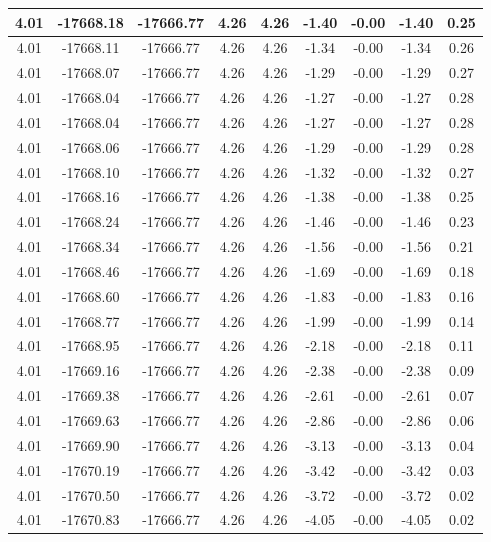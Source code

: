 \begin{table}[htbp]
\begin{adjustbox}{angle=90}
\begin{tabular}{|c|c|c|c|c|c|c|c|c|}
 4.01 & -17668.18 & -17666.77 & 4.26 & 4.26 & -1.40 & -0.00 & -1.40 & 0.25\\ \hline
 4.01 & -17668.11 & -17666.77 & 4.26 & 4.26 & -1.34 & -0.00 & -1.34 & 0.26\\ \hline
 4.01 & -17668.07 & -17666.77 & 4.26 & 4.26 & -1.29 & -0.00 & -1.29 & 0.27\\ \hline
 4.01 & -17668.04 & -17666.77 & 4.26 & 4.26 & -1.27 & -0.00 & -1.27 & 0.28\\ \hline
 4.01 & -17668.04 & -17666.77 & 4.26 & 4.26 & -1.27 & -0.00 & -1.27 & 0.28\\ \hline
 4.01 & -17668.06 & -17666.77 & 4.26 & 4.26 & -1.29 & -0.00 & -1.29 & 0.28\\ \hline
 4.01 & -17668.10 & -17666.77 & 4.26 & 4.26 & -1.32 & -0.00 & -1.32 & 0.27\\ \hline
 4.01 & -17668.16 & -17666.77 & 4.26 & 4.26 & -1.38 & -0.00 & -1.38 & 0.25\\ \hline
 4.01 & -17668.24 & -17666.77 & 4.26 & 4.26 & -1.46 & -0.00 & -1.46 & 0.23\\ \hline
 4.01 & -17668.34 & -17666.77 & 4.26 & 4.26 & -1.56 & -0.00 & -1.56 & 0.21\\ \hline
 4.01 & -17668.46 & -17666.77 & 4.26 & 4.26 & -1.69 & -0.00 & -1.69 & 0.18\\ \hline
 4.01 & -17668.60 & -17666.77 & 4.26 & 4.26 & -1.83 & -0.00 & -1.83 & 0.16\\ \hline
 4.01 & -17668.77 & -17666.77 & 4.26 & 4.26 & -1.99 & -0.00 & -1.99 & 0.14\\ \hline
 4.01 & -17668.95 & -17666.77 & 4.26 & 4.26 & -2.18 & -0.00 & -2.18 & 0.11\\ \hline
 4.01 & -17669.16 & -17666.77 & 4.26 & 4.26 & -2.38 & -0.00 & -2.38 & 0.09\\ \hline
 4.01 & -17669.38 & -17666.77 & 4.26 & 4.26 & -2.61 & -0.00 & -2.61 & 0.07\\ \hline
 4.01 & -17669.63 & -17666.77 & 4.26 & 4.26 & -2.86 & -0.00 & -2.86 & 0.06\\ \hline
 4.01 & -17669.90 & -17666.77 & 4.26 & 4.26 & -3.13 & -0.00 & -3.13 & 0.04\\ \hline
 4.01 & -17670.19 & -17666.77 & 4.26 & 4.26 & -3.42 & -0.00 & -3.42 & 0.03\\ \hline
 4.01 & -17670.50 & -17666.77 & 4.26 & 4.26 & -3.72 & -0.00 & -3.72 & 0.02\\ \hline
 4.01 & -17670.83 & -17666.77 & 4.26 & 4.26 & -4.05 & -0.00 & -4.05 & 0.02\\ \hline

\end{tabular}
\end{adjustbox}
\end{table}
